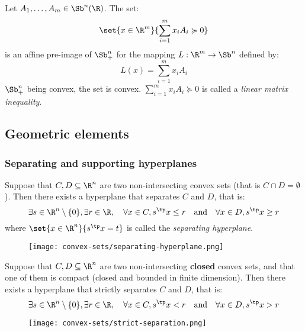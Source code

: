\begin{example}
    Let $A_1, \dots, A_m\in\Sb^n(\R)$. The set:
    \begin{equation*}
        \set{x\in\R^m}{\sum_{i=1}^m x_iA_i\succcurlyeq 0}
    \end{equation*}
    is an affine pre-image of $\Sb_+^n$ for the mapping $L:\R^m\to\Sb^n$ defined by:
    \begin{equation*}
        L(x) = \sum_{i=1}^m x_iA_i
    \end{equation*}
    $\Sb_+^n$ being convex, the set is convex. $\sum_{i=1}^m x_iA_i\succcurlyeq 0$ is called a \emph{linear matrix inequality}.
\end{example}

\subsection{Geometric elements}
\subsubsection{Separating and supporting hyperplanes}
\begin{property}
    Suppose that $C, D\subseteq\R^n$ are two non-intersecting convex sets (that is $C\cap D = \emptyset$). Then there exists a hyperplane that separates $C$ and $D$, that is:
    \begin{equation*}
        \exists s\in\R^n\setminus\{0\}, \exists r\in\R, \quad \forall x\in C, s^\tp x\leq r \quad \text{and} \quad \forall x\in D, s^\tp x\geq r
    \end{equation*}
    where $\set{x\in\R^n}{s^\tp x = t}$ is called the \emph{separating hyperplane}.
    \begin{figure}[H]
        \centering
        \texttt{[image: convex-sets/separating-hyperplane.png]}
    \end{figure}
\end{property}

\begin{property}
    Suppose that $C, D\subseteq\R^n$ are two non-intersecting \textbf{closed} convex sets, and that one of them is compact (closed and bounded in finite dimension). Then there exists a hyperplane that strictly separates $C$ and $D$, that is:
    \begin{equation*}
        \exists s\in\R^n\setminus\{0\}, \exists r\in\R, \quad \forall x\in C, s^\tp x< r \quad \text{and} \quad \forall x\in D, s^\tp x> r
    \end{equation*}
    \begin{figure}[H]
        \centering
        \texttt{[image: convex-sets/strict-separation.png]}
    \end{figure}
\end{property}

